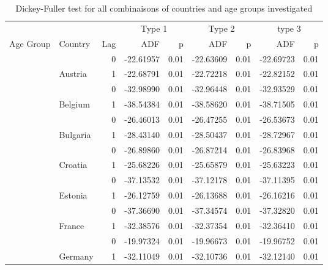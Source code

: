 \documentclass[
]{article}
\begin{document}
\begin{table}
\centering
\caption{\label{tab:unnamed-chunk-3}Dickey-Fuller test for all combinaisons of countries and age groups investigated}
\centering
\begin{tabular}[t]{l|l|r|r|r|r|r|r|r}
\hline
\multicolumn{3}{c|}{ } & \multicolumn{2}{c|}{Type 1} & \multicolumn{2}{c|}{Type 2} & \multicolumn{2}{c}{type 3} \\
\cline{4-5} \cline{6-7} \cline{8-9}
Age Group & Country & Lag & ADF & p & ADF & p & ADF & p\\
\hline
 &  & 0 & -22.61957 & 0.01 & -22.63609 & 0.01 & -22.69723 & 0.01\\
\cline{3-9}
 & \multirow{-2}{*}{\raggedright\arraybackslash Austria} & 1 & -22.68791 & 0.01 & -22.72218 & 0.01 & -22.82152 & 0.01\\
\cline{2-9}
 &  & 0 & -32.98990 & 0.01 & -32.96448 & 0.01 & -32.93529 & 0.01\\
\cline{3-9}
 & \multirow{-2}{*}{\raggedright\arraybackslash Belgium} & 1 & -38.54384 & 0.01 & -38.58620 & 0.01 & -38.71505 & 0.01\\
\cline{2-9}
 &  & 0 & -26.46013 & 0.01 & -26.47255 & 0.01 & -26.53673 & 0.01\\
\cline{3-9}
 & \multirow{-2}{*}{\raggedright\arraybackslash Bulgaria} & 1 & -28.43140 & 0.01 & -28.50437 & 0.01 & -28.72967 & 0.01\\
\cline{2-9}
 &  & 0 & -26.89860 & 0.01 & -26.87214 & 0.01 & -26.83968 & 0.01\\
\cline{3-9}
 & \multirow{-2}{*}{\raggedright\arraybackslash Croatia} & 1 & -25.68226 & 0.01 & -25.65879 & 0.01 & -25.63223 & 0.01\\
\cline{2-9}
 &  & 0 & -37.13532 & 0.01 & -37.12178 & 0.01 & -37.11395 & 0.01\\
\cline{3-9}
 & \multirow{-2}{*}{\raggedright\arraybackslash Estonia} & 1 & -26.12759 & 0.01 & -26.13688 & 0.01 & -26.16216 & 0.01\\
\cline{2-9}
 &  & 0 & -37.36690 & 0.01 & -37.34574 & 0.01 & -37.32820 & 0.01\\
\cline{3-9}
 & \multirow{-2}{*}{\raggedright\arraybackslash France} & 1 & -32.38576 & 0.01 & -32.37354 & 0.01 & -32.36410 & 0.01\\
\cline{2-9}
 &  & 0 & -19.97324 & 0.01 & -19.96673 & 0.01 & -19.96752 & 0.01\\
\cline{3-9}
 & \multirow{-2}{*}{\raggedright\arraybackslash Germany} & 1 & -32.11049 & 0.01 & -32.10736 & 0.01 & -32.12140 & 0.01\\

\end{tabular}
\end{table}
\end{document}
